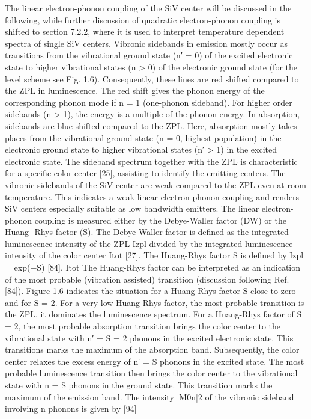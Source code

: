       The linear electron-phonon coupling of the SiV center will be discussed in the following, while further discussion of quadratic electron-phonon coupling is shifted to section 7.2.2, where it is used to interpret temperature dependent spectra of single SiV centers. Vibronic sidebands in emission mostly occur as transitions from the vibrational ground state (n′ = 0) of the excited electronic state to higher vibrational states (n > 0) of the electronic ground state (for the level scheme see Fig. 1.6). Consequently, these lines are red shifted compared to the ZPL in luminescence. The red shift gives the phonon energy of the corresponding phonon mode if n = 1 (one-phonon sideband). For higher order sidebands (n > 1), the energy is a multiple of the phonon energy. In absorption, sidebands are blue shifted compared to the ZPL. Here, absorption mostly takes places from the vibrational ground state (n = 0, highest population) in the electronic ground state to higher vibrational states (n′ > 1) in the excited electronic state. The sideband spectrum together with the ZPL is characteristic for a specific color center [25], assisting to identify the emitting centers. The vibronic sidebands of the SiV center are weak compared to the ZPL even at room temperature. This indicates a weak linear electron-phonon coupling and renders SiV centers especially suitable as low bandwidth emitters. The linear electron- phonon coupling is measured either by the Debye-Waller factor (DW) or the Huang- Rhys factor (S). The Debye-Waller factor is defined as the integrated luminescence intensity of the ZPL Izpl divided by the integrated luminescence intensity of the
      color center Itot [27]. The Huang-Rhys factor S is defined by Izpl = exp(−S) [84]. Itot
      The Huang-Rhys factor can be interpreted as an indication of the most probable (vibration assisted) transition (discussion following Ref. [84]). Figure 1.6 indicates the situation for a Huang-Rhys factor S close to zero and for S = 2. For a very low Huang-Rhys factor, the most probable transition is the ZPL, it dominates the luminescence spectrum. For a Huang-Rhys factor of S = 2, the most probable absorption transition brings the color center to the vibrational state with n′ = S = 2 phonons in the excited electronic state. This transitions marks the maximum of the absorption band. Subsequently, the color center relaxes the excess energy of n′ = S phonons in the excited state. The most probable luminescence transition then brings the color center to the vibrational state with n = S phonons in the ground state. This transition marks the maximum of the emission band. The intensity |M0n|2 of the vibronic sideband involving n phonons is given by [94]
